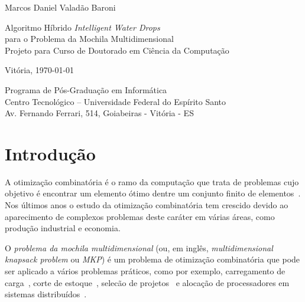 \documentclass[brazil]{article}
\begin{document}
\begin{titlepage}

\begin{center}

\LARGE{Marcos Daniel Valadão Baroni}

\vspace{40mm}

\LARGE{Algoritmo Híbrido \textit{Intelligent Water Drops} \\ para o Problema da Mochila Multidimensional} \\
\vspace{5mm}
\Large{Projeto para Curso de Doutorado em Ciência da Computação}

\vspace{65mm}

\normalsize{Vitória, \today} \\

\vfill

\begin{small}
Programa de Pós-Graduação em Informática \\
Centro Tecnológico -- Universidade Federal do Espírito Santo \\
Av. Fernando Ferrari, 514, Goiabeiras - Vitória - ES \\
\end{small}

\end{center}

\end{titlepage}

\newpage

\tableofcontents{}

\section{Introdução}

A otimização combinatória é o ramo da computação que
trata de pro\-ble\-mas cujo objetivo é encontrar um elemento ótimo
dentre um conjunto finito de elementos~\cite{Schrijver2003}.
Nos últimos anos o estudo da otimização combinatória tem crescido
de\-vi\-do ao aparecimento de complexos problemas deste caráter em
várias áreas, como produção industrial e economia.

O \textit{problema da mochila multidimensional} (ou, em inglês, \textit{multidimensional knapsack problem}
ou \textit{MKP}) é um problema de otimização combina\-tó\-ria que pode ser aplicado a
vários problemas práticos, como por exemplo, carregamento de carga~\cite{Shih-1979},
corte de estoque~\cite{Gilmore-Gomory-1966}, selecão de projetos~\cite{Li-Chiu-Cox-1999}
e alocação de processadores
em sistemas distribuídos~\cite{Gavish-Pirckul-1982}.
\end{document}

